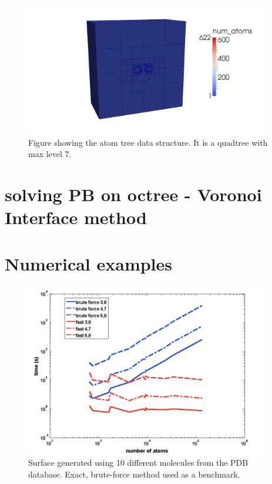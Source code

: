 \documentclass{elsarticle}
\theoremstyle{own}
\begin{document}
\begin{figure}[ht]
\begin{center}
\includegraphics[width=0.945\textwidth]{../figs/atom_tree_3J6D}
\end{center}
\caption{Figure showing the atom tree data structure. It is a quadtree with max level 7. } \label{fig:atom_tree_3J6D}
\end{figure}



\section{solving PB on octree - Voronoi Interface method}

\section{Numerical examples}


\begin{figure}[ht]
\begin{center}
\includegraphics[width=0.945\textwidth]{../figs/fast_gen_timing}
\end{center}
\caption{Surface generated using 10 different molecules from the PDB database. Exact, brute-force method used as a benchmark.} \label{fig:fast_gen_timing}
\end{figure}
\end{document}

